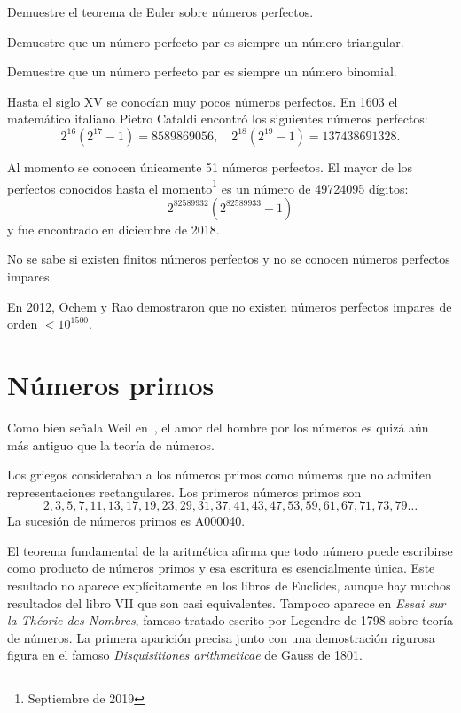 \begin{exercise}
	Demuestre el teorema de Euler sobre números perfectos.
\end{exercise}

\begin{exercise}
	Demuestre que un número perfecto par es siempre un número triangular. 
\end{exercise}

\begin{exercise}
	Demuestre que un número perfecto par es siempre un número binomial.
\end{exercise}

Hasta el siglo XV se conocían muy pocos números perfectos.  En 1603 el
matemático italiano Pietro Cataldi encontró los siguientes números perfectos: 
\[
	2^{16}(2^{17} - 1) = 8 589 869 056,\quad
	2^{18}(2^{19} - 1)= 137 438691 328. 
\] 

Al momento se conocen únicamente 51 números perfectos. El mayor de los
perfectos conocidos hasta el momento\footnote{Septiembre de 2019} es un número
de 49724095 dígitos:
\[
	2^{82 589 932} (2^{82 589 933} - 1)
\]
y fue encontrado en diciembre de 2018.

No se sabe si existen finitos números perfectos y no se conocen números
perfectos impares.  

En 2012, Ochem y Rao demostraron que no existen números
perfectos impares de orden $<10^{1500}$. 

\section*{Números primos}

Como bien señala Weil en~\cite{MR734177}, el amor del hombre por los números es
quizá aún más antiguo que la teoría de números.  

Los griegos consideraban a los números primos como números que no admiten
representaciones rectangulares.  Los primeros números primos son
\[
    2, 3, 5, 7, 11, 13, 17, 19, 23, 29, 31, 37, 41, 43, 47, 53, 59, 61, 67, 71, 73, 79\dots
\]
La sucesión de números primos es \href{https://oeis.org/A000040}{A000040}.

El teorema fundamental de la aritmética afirma que todo número puede escribirse
como producto de números primos y esa escritura es esencialmente única. Este
resultado no aparece explícitamente en los libros de Euclides, aunque hay
muchos resultados del libro VII que son casi equivalentes. Tampoco aparece en
\emph{Essai sur la Théorie des Nombres}, famoso tratado escrito por Legendre de
1798 sobre teoría de números. La primera aparición precisa junto con una
demostración rigurosa figura en el famoso \emph{Disquisitiones arithmeticae} de
Gauss de 1801. 


